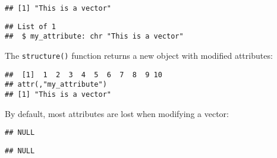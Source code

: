 \begin{verbatim}
## [1] "This is a vector"
\end{verbatim}

\begin{Shaded}
\begin{Highlighting}[]
\NormalTok{(}
\end{Highlighting}
\end{Shaded}

\begin{verbatim}
## List of 1
##  $ my_attribute: chr "This is a vector"
\end{verbatim}

The \texttt{structure()} function returns a new object with modified
attributes: 

\begin{Shaded}
\begin{Highlighting}[]
\NormalTok{(}\OperatorTok{:}\NormalTok{, } \NormalTok{)}
\end{Highlighting}
\end{Shaded}

\begin{verbatim}
##  [1]  1  2  3  4  5  6  7  8  9 10
## attr(,"my_attribute")
## [1] "This is a vector"
\end{verbatim}

By default, most attributes are lost when modifying a vector:

\begin{Shaded}
\begin{Highlighting}[]
\NormalTok{(y[}\NormalTok{])}
\end{Highlighting}
\end{Shaded}

\begin{verbatim}
## NULL
\end{verbatim}

\begin{Shaded}
\begin{Highlighting}[]
\NormalTok{(}
\end{Highlighting}
\end{Shaded}

\begin{verbatim}
## NULL
\end{verbatim}

